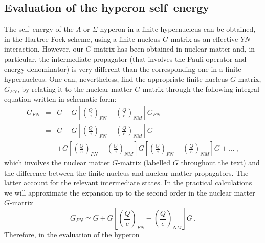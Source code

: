 
\subsection{Evaluation of the hyperon self--energy}

The self--energy of the $\Lambda$ or $\Sigma$ hyperon in a finite
hypernucleus can be obtained, in the Hartree-Fock scheme, using a
finite nucleus $G$-matrix as an effective $YN$ interaction. 
However, our $G$-matrix
has been obtained in nuclear matter and, in particular, the
intermediate propagator (that involves the Pauli operator and energy
denominator) is very different than the corresponding one in a finite
hypernucleus.  One can, nevertheless, find the appropriate finite 
nucleus $G$-matrix, $G_{FN}$, by relating it to the 
nuclear matter $G$-matrix through the following integral equation written 
in schematic form:
\begin{eqnarray}
G_{FN} &= &G + G \left[ \left( \frac{Q}{e} \right)_{FN} 
-\left( \frac{Q}{e} \right)_{NM} \right] G_{FN} \nonumber \\
&= &G + G \left[ \left( \frac{Q}{e} \right)_{FN} 
-\left( \frac{Q}{e} \right)_{NM} \right] G  \nonumber \\
&& + G \left[ \left( \frac{Q}{e} \right)_{FN}  
-\left( \frac{Q}{e} \right)_{NM} \right] 
 G \left[ \left( \frac{Q}{e} \right)_{FN} 
-\left( \frac{Q}{e} \right)_{NM} \right] G + \dots  \ ,
\label{eq:gexpan}
\end{eqnarray}
which involves the nuclear matter $G$-matrix (labelled $G$ throughout the
text) and the difference between
the finite nucleus and nuclear matter propagators. The latter account
for the relevant intermediate states.
In the practical calculations we will approximate
the expansion up to the second order in the nuclear matter $G$-matrix
\begin{equation}
G_{FN} \simeq G + G \left[ \left( \frac{Q}{e} \right)_{FN} 
-\left( \frac{Q}{e} \right)_{NM} \right] G \ . 
\label{eq:gexpan2}
\end{equation}
Therefore, in the evaluation of the hyperon
